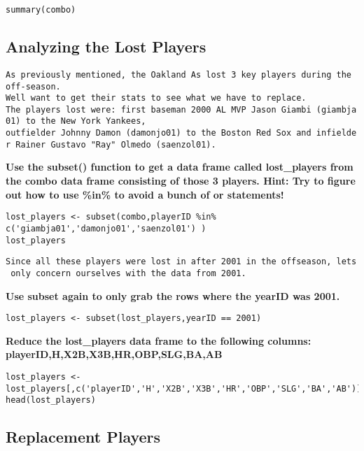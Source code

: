 \documentclass[
]{article}
\begin{document}
\begin{verbatim}
summary(combo)
\end{verbatim}

\hypertarget{analyzing-the-lost-players}{%
\subsection{Analyzing the Lost
Players}\label{analyzing-the-lost-players}}

\texttt{As\ previously\ mentioned,\ the\ Oakland\ A\textquotesingle{}s\ lost\ 3\ key\ players\ during\ the\ off-season.}
\texttt{We\textquotesingle{}ll\ want\ to\ get\ their\ stats\ to\ see\ what\ we\ have\ to\ replace.}
\texttt{The\ players\ lost\ were:\ first\ baseman\ 2000\ AL\ MVP\ Jason\ Giambi\ (giambja01)\ to\ the\ New\ York\ Yankees,}
\texttt{outfielder\ Johnny\ Damon\ (damonjo01)\ to\ the\ Boston\ Red\ Sox\ and\ infielder\ Rainer\ Gustavo\ "Ray"\ Olmedo\ (\textquotesingle{}saenzol01\textquotesingle{}).}

\textbf{Use the subset() function to get a data frame called
lost\_players from the combo data frame consisting of those 3 players.
Hint: Try to figure out how to use \%in\% to avoid a bunch of or
statements!}

\begin{verbatim}
lost_players <- subset(combo,playerID %in% c('giambja01','damonjo01','saenzol01') )
lost_players
\end{verbatim}

\texttt{Since\ all\ these\ players\ were\ lost\ in\ after\ 2001\ in\ the\ offseason,\ let\textquotesingle{}s\ only\ concern\ ourselves\ with\ the\ data\ from\ 2001.}

\textbf{Use subset again to only grab the rows where the yearID was
2001.}

\begin{verbatim}
lost_players <- subset(lost_players,yearID == 2001)
\end{verbatim}

\textbf{Reduce the lost\_players data frame to the following columns:
playerID,H,X2B,X3B,HR,OBP,SLG,BA,AB}

\begin{verbatim}
lost_players <- lost_players[,c('playerID','H','X2B','X3B','HR','OBP','SLG','BA','AB')]
head(lost_players)
\end{verbatim}

\hypertarget{replacement-players}{%
\subsection{Replacement Players}\label{replacement-players}}
\end{document}

